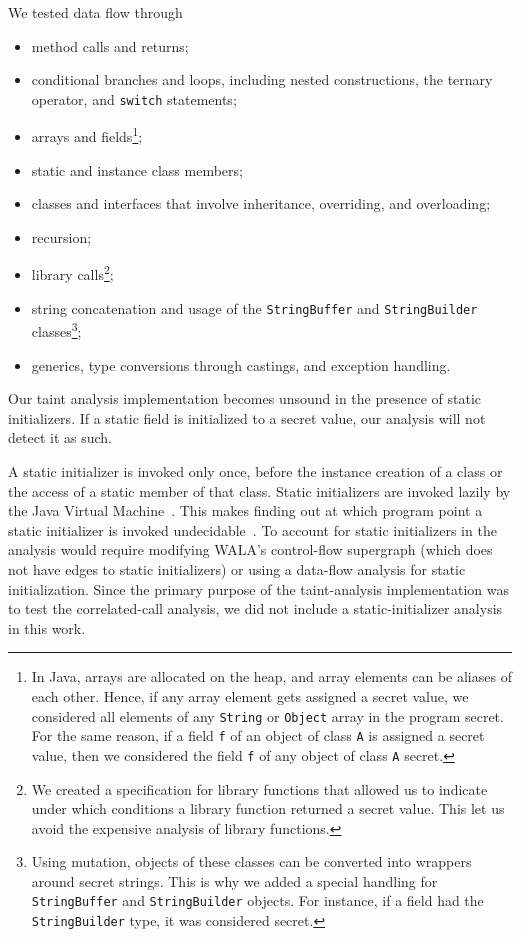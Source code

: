\begin{mdelete}
We tested data flow through
\begin{itemize}
  \item method calls and returns;
  \item conditional branches and loops, including nested constructions, the ternary operator, and \verb'switch' statements;
  \item arrays and fields\footnote{%
    In Java, arrays are allocated on the heap, and array elements can be aliases of each other. 
    Hence, if any array element gets assigned a secret value, we considered all elements of any \texttt{String} or \texttt{Object} array in the program secret. 
    For the same reason, if a field \texttt{f} of an object of class \texttt{A} is assigned a secret value, then we considered the field \texttt{f} of any object of class \texttt{A} secret.%
  };
  \item static and instance class members;
  \item classes and interfaces that involve inheritance, overriding, and overloading;
  \item recursion;
  \item library calls\footnote{%
    We created a specification for library functions that allowed us to indicate under which conditions a library function returned a secret value. This let us avoid the expensive analysis of library functions.%
  };
  \item string concatenation and usage of the \texttt{StringBuffer} and \texttt{StringBuilder} classes\footnote{%
    Using mutation, objects of these classes can be converted into wrappers around secret strings. This is why we added a special handling for \texttt{StringBuffer} and \texttt{StringBuilder} objects. For instance, if a field had the  \texttt{StringBuilder} type, it was considered secret.%
  };
  \item generics, type conversions through castings, and exception handling.
\end{itemize}

Our taint analysis implementation becomes unsound in the presence of static initializers. If a static field is initialized to a secret value, our analysis will not detect it as such.

A static initializer is invoked only once, before the instance creation of a class or the access of a static member of that class.
Static initializers are invoked lazily by the Java Virtual Machine~\cite{lindholmjava}. This makes finding out at which program point a static initializer is invoked undecidable~\cite{hubert2009soundly}. To account for static initializers in the analysis would require modifying WALA's control-flow supergraph (which does not have edges to static initializers) or using a data-flow analysis for static initialization. Since the primary purpose of the taint-analysis implementation was to test the correlated-call analysis, we did not include a static-initializer analysis in this work.
\end{mdelete}

